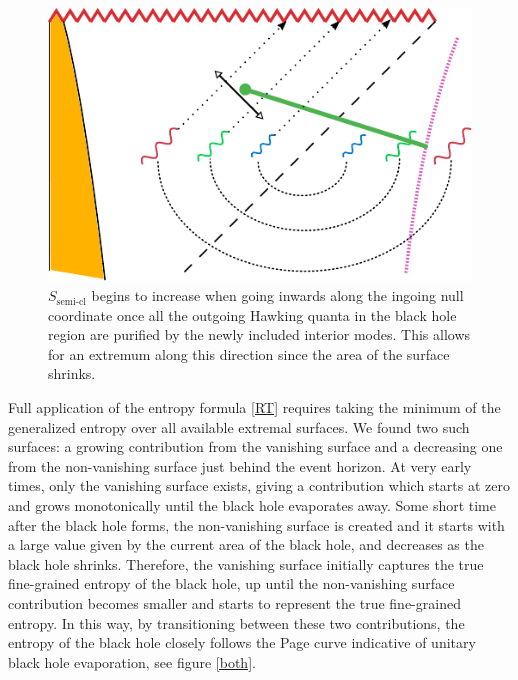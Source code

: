 \begin{figure}[t]
\begin{center}
\includegraphics[scale=.5]{figures/simpleextremization}
\caption{$S_\mathrm{semi\text{-} cl}$ begins to increase when going inwards along the ingoing null coordinate once all the outgoing Hawking quanta in the black hole region are purified by the newly included interior modes. This allows for an extremum along this direction since the area of the surface shrinks.   }
\label{simpleextremization}
\end{center}
\end{figure}





Full application of the entropy formula \eqref{RT} requires taking the minimum of the generalized entropy over all available extremal surfaces. We found two such surfaces: a growing contribution from the vanishing    surface and a decreasing one from the non-vanishing  surface just behind the event horizon. At very early times, only the vanishing surface exists, giving a contribution which starts at zero and grows monotonically until the black hole evaporates away. Some short time after the black hole forms, the non-vanishing surface is created and it starts with a large value given by the current area of the black hole, and decreases as the black hole shrinks. Therefore, the vanishing surface initially captures the true fine-grained entropy of the black hole, up until  the non-vanishing surface contribution becomes smaller and starts to represent the true fine-grained entropy. In this way, by transitioning between these two contributions, the entropy of the black hole closely follows the Page curve indicative of unitary black hole evaporation, see figure \ref{both}. 


